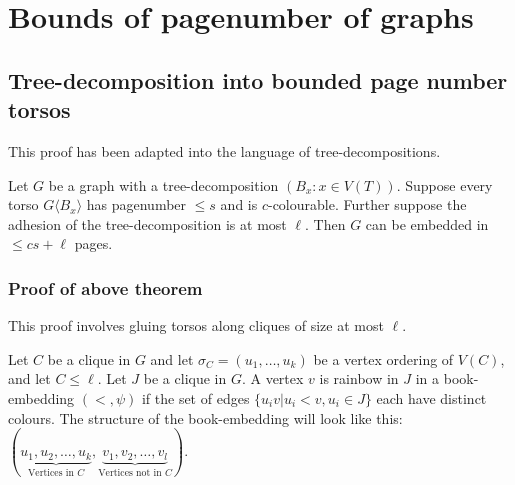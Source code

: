 \section{Bounds of pagenumber of graphs}\label{sec:BoundedPagenumber}
\subsection{Tree-decomposition into bounded page number torsos}\label{ssec:Clique_sum_Pagenumber_bound}

This proof has been adapted into the language of tree-decompositions.
\begin{theorem}\label{thm:clique_sum_pagenumber_bound}
	Let \(G\) be a graph with a tree-decomposition \((B_x: x \in V(T))\). Suppose every torso \(G \langle B_x \rangle\) has pagenumber \(\leq s\) and is \(c\)-colourable. Further suppose the adhesion of the tree-decomposition is at most \(\ell\).
	Then $G$ can be embedded in \(\leq cs + \ell \) pages.
\end{theorem}

\subsubsection{Proof of above theorem}
This proof involves gluing torsos along cliques of size at most \( \ell \).

Let \(C\) be a clique in \(G\) and let \(\sigma_C = (u_1, \ldots , u_k)\) be a vertex ordering of \(V(C)\), and let \(C \leq \ell \). Let $J$ be a clique in $G$. A vertex $v$ is rainbow in $J$ in a book-embedding $(<, \psi)$ if the set of edges $\{u_i v | u_i < v, u_i \in J\}$ each have distinct colours. The structure of the book-embedding will look like this: \((\underbrace{u_1, u_2, \ldots, u_k}_{\text{Vertices in } C}, \underbrace{v_1, v_2, \ldots, v_l}_{\text{Vertices not in }C})\).

